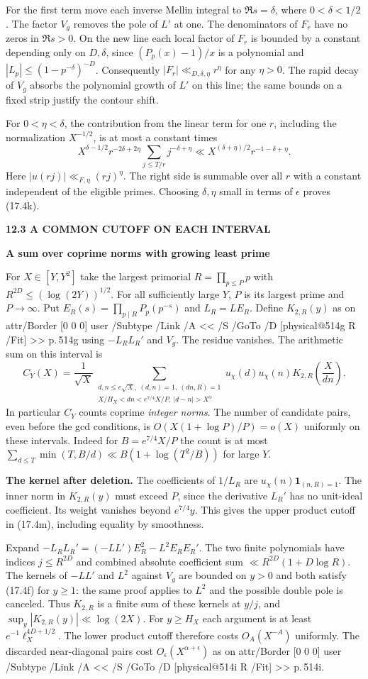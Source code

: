 \documentclass[11pt,letterpaper]{article}
\makeatletter
\newcommand{\rightmarktext}{}
\newcommand{\printfolio}{}
\newcommand{\leaf}[4]{\clearpage\gdef\printfolio{#1}\gdef\rightmarktext{#2}%
  {\small\sffamily\bfseries\color{ink}#3\par}\vspace{3pt}%
  {\LARGE\bfseries #4\par}\vspace{5pt}}
\newcommand{\point}[1]{\par\smallskip\textbf{#1.}\enspace\ignorespaces}
\newcommand{\MusicPDFPageRef}[1]{\pdfpageref\csname physical@#1\endcsname\space\space 0 R}
\newcommand{\pagelink}[2]{\leavevmode\pdfstartlink attr{/Border [0 0 0]} user{%
  /Subtype /Link /A << /S /GoTo /D [\MusicPDFPageRef{#1} /Fit] >>}%
  {\color{ink}#2}\pdfendlink}
\newcommand{\pg}[1]{\pagelink{#1}{p.\,#1}}
\makeatother
\begin{document}
For the first term move each inverse Mellin integral to
$\Re s=\delta$, where $0<\delta<1/2$. The factor $V_g$ removes
the pole of $L'$ at one. The denominators of $F_r$ have no zeros
in $\Re s>0$. On the new line each local factor of $F_r$ is bounded
by a constant depending only on $D,\delta$, since $(P_p(x)-1)/x$
is a polynomial and $|L_p|\le(1-p^{-\delta})^{-D}$.
Consequently $|F_r|\ll_{D,\delta,\eta}r^\eta$ for any $\eta>0$.
The rapid decay of $V_g$ absorbs the polynomial growth of $L'$ on
this line; the same bounds on a fixed strip justify the contour shift.

For $0<\eta<\delta$, the contribution from the linear term for one
$r$, including the normalization $X^{-1/2}$, is at most a constant
times
\[
 X^{\delta-1/2}r^{-2\delta+2\eta}
        \sum_{j\le T/r}j^{-\delta+\eta}
    \ll X^{(\delta+\eta)/2}r^{-1-\delta+\eta}.
\]
Here $|u(rj)|\ll_{F,\eta}(rj)^\eta$. The right side is summable
over all $r$ with a constant independent of the eligible primes.
Choosing $\delta,\eta$ small in terms of $\epsilon$ proves (17.4k).

\leaf{514r}{Deleting the small primes}{12.3 \quad A COMMON CUTOFF ON EACH INTERVAL}{A sum over coprime norms with growing least prime}
For $X\in[Y,Y^2]$ take the largest primorial $R=\prod_{p\le P}p$
with $R^{2D}\le(\log(2Y))^{1/2}$. For all sufficiently large $Y$,
$P$ is its largest prime and $P\to\infty$. Put
$E_R(s)=\prod_{p\mid R}P_p(p^{-s})$ and $L_R=L E_R$.
Define $K_{2,R}(y)$ as on \pg{514g} using $-L_R L_R'$ and $V_g$.
The residue vanishes. The arithmetic sum on this interval is
\[
 C_Y(X)=\frac1{\sqrt X}
 \sum_{\substack{d,n\le e\sqrt X,\ (d,n)=1,\ (dn,R)=1\\
  X/H_X<dn<e^{7/4}X/P,\ |d-n|>X^\alpha}}
             u_\chi(d)u_\chi(n)K_{2,R}\!\left(\frac{X}{dn}\right).
 \tag{17.4m}
\]
In particular $C_Y$ counts coprime \emph{integer norms}. The number
of candidate pairs, even before the gcd conditions, is
$O(X(1+\log P)/P)=o(X)$ uniformly on these intervals.
Indeed for $B=e^{7/4}X/P$ the count is at most
$\sum_{d\le T}\min(T,B/d)\ll B(1+\log(T^2/B))$ for large $Y$.

\point{The kernel after deletion}
The coefficients of $1/L_R$ are $u_\chi(n)\mathbf1_{(n,R)=1}$.
The inner norm in $K_{2,R}(y)$ must exceed $P$, since the derivative
$L_R'$ has no unit-ideal coefficient. Its weight
vanishes beyond $e^{7/4}y$. This gives the upper product cutoff in
(17.4m), including equality by smoothness.

Expand $-L_R L_R'=(-LL')E_R^2-L^2 E_R E_R'$. The two finite
polynomials have indices $j\le R^{2D}$ and combined absolute
coefficient sum $\ll R^{2D}(1+D\log R)$. The kernels of $-LL'$
and $L^2$ against $V_g$ are bounded on $y>0$ and both satisfy
(17.4f) for $y\ge1$: the same proof applies to $L^2$ and the possible
double pole is canceled. Thus $K_{2,R}$ is a finite sum of these
kernels at $y/j$, and $\sup_y|K_{2,R}(y)|\ll\log(2X)$.
For $y\ge H_X$ each argument is at least
$e^{-1}\ell_X^{4D+1/2}$. The lower product cutoff therefore costs
$O_A(X^{-A})$ uniformly. The discarded near-diagonal pairs cost
$O_\epsilon(X^{\alpha+\epsilon})$ as on \pg{514i}.
\end{document}

